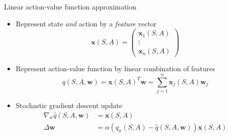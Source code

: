 \bgroup
\begin{frame}{Linear action-value function approximation}
\begin{itemize}
\item Represent state \emph{and} action by a \emph{feature} vector
\begin{equation*}
\textbf{x}(S,A)=\left(\begin{array}{c}
\textbf{x}_1(S,A)\\
\vdots\\
\textbf{x}_n(S,A)
\end{array}\right)
\end{equation*}
%
\item Represent action-value function by linear combination of features
\begin{equation*}
\hat{q}(S, A, \textbf{w}) = \textbf{x}(S,A)^T\textbf{w}=\sum_{j=1}^n\textbf{x}_j(S,A)\textbf{w}_j
\end{equation*}
%
\item Stochastic gradient descent update
\begin{align*}
\nabla_w\hat{q}(S,A,\textbf{w})&=\textbf{x}(S,A)\\	
\Delta \textbf{w} &= \alpha(q_{\pi}(S,A)-\hat{q}(S,A,\textbf{w}))\textbf{x}(S,A)
\end{align*}
\end{itemize}
\end{frame}
\egroup